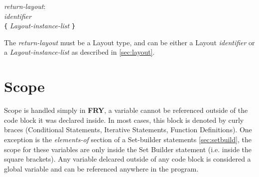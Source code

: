 \documentclass{article}
\begin{document}
\begin{tabbing}
	\= \emph{retu}\=\emph{rn-layout}: \\
	\> \> \emph{identifier} \\
	\> \> \texttt{\{} \emph{Layout-instance-list} \texttt{\}}
\end{tabbing}
The \emph{return-layout} must be a Layout type, and can be either a Layout \emph{identifier} or a \emph{Layout-instance-list} as described in \ref{sec:layout}.

\section{Scope}
Scope is handled simply in \textbf{FRY}, a variable cannot be referenced outside of the code block it was declared inside. In most cases, this block is denoted by curly braces (Conditional Statements, Iterative Statements, Function Definitions). One exception is the \emph{elements-of} section of a Set-builder statements \ref{sec:setbuild}, the scope for these variables are only inside the Set Builder statement (i.e. inside the square brackets). Any variable delcared outside of any code block is considered a global variable and can be referenced anywhere in the program.
\end{document}
